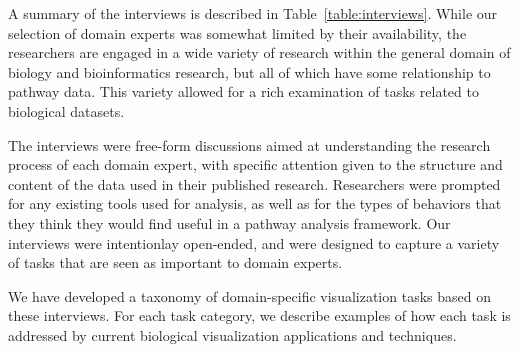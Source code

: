 \documentclass[twocolumn]{bmcart}%
\begin{document}
A summary of the interviews is described in Table~\ref{table:interviews}.
While our selection of domain experts was somewhat limited by their availability, the researchers are engaged in a wide variety of research within the general domain of biology and bioinformatics research, but all of which have some relationship to pathway data.
This variety allowed for a rich examination of tasks related to biological datasets.

The interviews were free-form discussions aimed at understanding the research process of each domain expert, with specific attention given to the structure and content of the data used in their published research.
Researchers were prompted for any existing tools used for analysis, as well as for the types of behaviors that they think they would find useful in a pathway analysis framework.
Our interviews were intentionlay open-ended, and were designed to capture a variety of tasks that are seen as important to domain experts.

We have developed a taxonomy of domain-specific visualization tasks based on these interviews. For each task category, we describe examples of how each task is addressed by current biological visualization applications and techniques.
\end{document}
